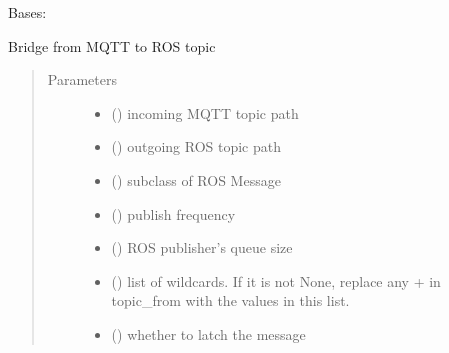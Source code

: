 \documentclass[letterpaper,10pt,english]{sphinxmanual}
\begin{document}
\begin{fulllineitems}
\label{\detokenize{source/mqtt_bridge/mqtt_bridge:mqtt_bridge.bridge.MqttToRosBridge}}
Bases: {\hyperref[\detokenize{source/mqtt_bridge/mqtt_bridge:mqtt_bridge.bridge.Bridge}]{}}

Bridge from MQTT to ROS topic
\begin{quote}\begin{description}
\item[{Parameters}] \leavevmode\begin{itemize}
\item {} 
 () \textendash{} incoming MQTT topic path

\item {} 
 () \textendash{} outgoing ROS topic path

\item {} 
 () \textendash{} subclass of ROS Message

\item {} 
 () \textendash{} publish frequency

\item {} 
 () \textendash{} ROS publisher’s queue size

\item {} 
 () \textendash{} list of wildcards. If it is not None, replace any + in topic\_from with the values in this list.

\item {} 
 () \textendash{} whether to latch the message

\end{itemize}

\end{description}\end{quote}

\end{fulllineitems}
\end{document}
